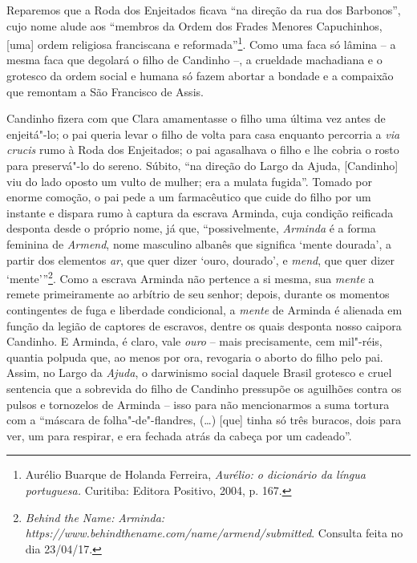 Reparemos que a Roda dos Enjeitados ficava ``na direção da rua dos
Barbonos'', cujo nome alude aos ``membros da Ordem dos Frades Menores
Capuchinhos, {[}uma{]} ordem religiosa franciscana e
reformada''\footnote{Aurélio Buarque de Holanda Ferreira, \emph{Aurélio:
  o dicionário da língua portuguesa.} Curitiba: Editora Positivo, 2004,
  p. 167.}. Como uma faca só lâmina -- a mesma faca que degolará o filho
de Candinho --, a crueldade machadiana e o grotesco da ordem social e
humana só fazem abortar a bondade e a compaixão que remontam a São
Francisco de Assis.

Candinho fizera com que Clara amamentasse o filho uma última vez antes
de enjeitá"-lo; o pai queria levar o filho de volta para casa enquanto
percorria a \emph{via crucis} rumo à Roda dos Enjeitados; o pai
agasalhava o filho e lhe cobria o rosto para preservá"-lo do sereno.
Súbito, ``na direção do Largo da Ajuda, {[}Candinho{]} viu do lado
oposto um vulto de mulher; era a mulata fugida''. Tomado por enorme
comoção, o pai pede a um farmacêutico que cuide do filho por um instante
e dispara rumo à captura da escrava Arminda, cuja condição reificada
desponta desde o próprio nome, já que, ``possivelmente, \emph{Arminda} é
a forma feminina de \emph{Armend}, nome masculino albanês que significa
`mente dourada', a partir dos elementos \emph{ar}, que quer dizer `ouro,
dourado', e \emph{mend}, que quer dizer `mente'''\footnote{\emph{Behind
  the Name:} \emph{Arminda:
  https://www.behindthename.com/name/armend/submitted}.
  Consulta feita no dia 23/04/17.}. Como a escrava Arminda não pertence
a si mesma, sua \emph{mente} a remete primeiramente ao arbítrio de seu
senhor; depois, durante os momentos contingentes de fuga e liberdade
condicional, a \emph{mente} de Arminda é alienada em função da legião de
captores de escravos, dentre os quais desponta nosso caipora Candinho. E
Arminda, é claro, vale \emph{ouro} -- mais precisamente, cem mil"-réis,
quantia polpuda que, ao menos por ora, revogaria o aborto do filho pelo
pai. Assim, no Largo da \emph{Ajuda}, o darwinismo social daquele Brasil
grotesco e cruel sentencia que a sobrevida do filho de Candinho
pressupõe os aguilhões contra os pulsos e tornozelos de Arminda -- isso
para não mencionarmos a suma tortura com a ``máscara de
folha"-de"-flandres, (\ldots{}) [que] tinha só três buracos, dois para ver,
um para respirar, e era fechada atrás da cabeça por um cadeado''.

